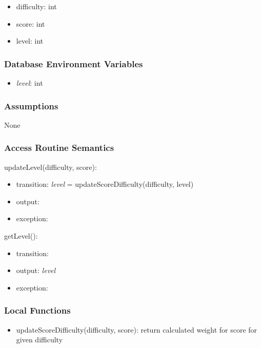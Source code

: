 \documentclass[12pt, titlepage]{article}
\begin{document}
\begin{itemize}
    \item difficulty: int
    \item score: int
    \item level: int
\end{itemize}

\subsubsection{Database Environment Variables}

\begin{itemize}
    \item \textit{level}: int
\end{itemize}

\subsubsection{Assumptions}

None

\subsubsection{Access Routine Semantics}

\noindent updateLevel(difficulty, score):
\begin{itemize}
\item transition: \textit{level} = updateScoreDifficulty(difficulty, level)
\item output: 
\item exception: 
\end{itemize}

\noindent getLevel():
\begin{itemize}
\item transition:
\item output: \textit{level}
\item exception: 
\end{itemize}


\subsubsection{Local Functions}

\begin{itemize}
    \item updateScoreDifficulty(difficulty, score): return calculated weight for score for given difficulty
\end{itemize}

\


%
%
\end{document}
